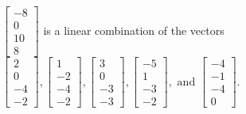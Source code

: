 \begin{exercise}
\begin{exerciseStatement}
  \end{exerciseStatement}
  \begin{exerciseAnswer}
   \(\left[\begin{array}{c}
-8 \\
0 \\
10 \\
8
\end{array}\right]\) 
  	 is  
	a linear combination of the vectors \(\left[\begin{array}{c}
2 \\
0 \\
-4 \\
-2
\end{array}\right] , \left[\begin{array}{c}
1 \\
-2 \\
-4 \\
-2
\end{array}\right] , \left[\begin{array}{c}
3 \\
0 \\
-3 \\
-3
\end{array}\right] , \left[\begin{array}{c}
-5 \\
1 \\
-3 \\
-2
\end{array}\right] , \text{ and } \left[\begin{array}{c}
-4 \\
-1 \\
-4 \\
0
\end{array}\right]\).

	
  


  \end{exerciseAnswer}
\end{exercise}
